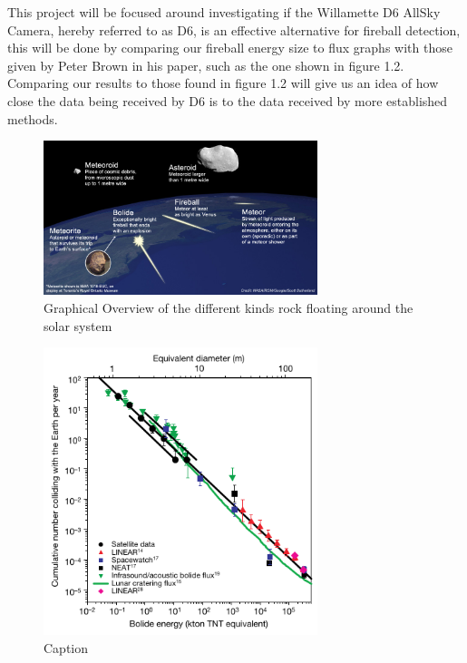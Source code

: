 This project will be focused around investigating if the Willamette D6 AllSky Camera, hereby referred to as D6, is an effective alternative for fireball detection, this will be done by comparing our fireball energy size to flux graphs with those given by Peter Brown in his paper, such as the one shown in figure 1.2. Comparing our results to those found in figure 1.2 will give us an idea of how close the data being received by D6 is to the data received by more established methods.




\begin{figure}
    \centering
    \includegraphics[width=8cm]{Meteor_comparison.png}
    \centering
    \caption{Graphical Overview of the different kinds rock floating around the solar system}
    \label{fig: 1.1}
\end{figure}

\begin{figure}
    \centering
    \includegraphics[width=8cm]{flux_brown.png}
    \centering
    \caption{Caption}
    \label{fig: 1.2}
\end{figure}
